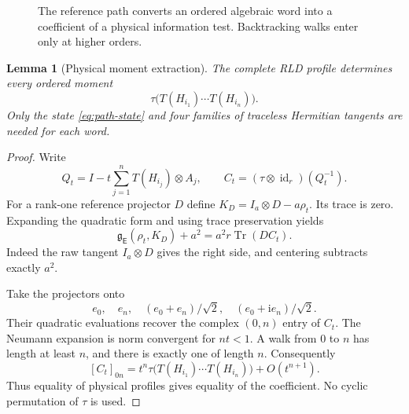 \documentclass[11pt,reqno]{amsart}
\newtheorem{lemma}[theorem]{Lemma}
\theoremstyle{definition}
\theoremstyle{remark}
\numberwithin{equation}{section}
\DeclareMathOperator{\Tr}{Tr}
\DeclareMathOperator{\id}{id}
\newcommand{\E}{\mathsf E}
\newcommand{\ii}{\mathrm i}
\newcommand{\rld}{\mathfrak g}
\begin{document}
\begin{figure}[htbp]
\centering
{}
\caption{The reference path converts an ordered algebraic word into a coefficient of a physical information test. Backtracking walks enter only at higher orders.}
\label{fig:path}
\end{figure}

\begin{lemma}[Physical moment extraction]\label{lem:path}
The complete RLD profile determines every ordered moment
\[
 \tau\bigl(T(H_{i_1})\cdots T(H_{i_n})\bigr).
\]
Only the state \eqref{eq:path-state} and four families of traceless Hermitian tangents are needed for each word.
\end{lemma}

\begin{proof}
Write
\[
 Q_t=I-t\sum_{j=1}^nT(H_{i_j})\otimes A_j,
 \qquad C_t=(\tau\otimes\id_r)(Q_t^{-1}).
\]
For a rank-one reference projector $D$ define $K_D=I_a\otimes D-a\rho_t$. Its trace is zero. Expanding the quadratic form and using trace preservation yields
\begin{equation}\label{eq:path-readout}
 \rld_\E(\rho_t,K_D)+a^2
 =a^2r\Tr(D C_t).
\end{equation}
Indeed the raw tangent $I_a\otimes D$ gives the right side, and centering subtracts exactly $a^2$.

Take the projectors onto
\begin{equation}\label{eq:four-projectors}
 e_0,\quad e_n,\quad (e_0+e_n)/\sqrt2,\quad (e_0+\ii e_n)/\sqrt2.
\end{equation}
Their quadratic evaluations recover the complex $(0,n)$ entry of $C_t$. The Neumann expansion is norm convergent for $nt<1$. A walk from $0$ to $n$ has length at least $n$, and there is exactly one of length $n$. Consequently
\begin{equation}\label{eq:path-coefficient}
 [C_t]_{0n}
 =t^n\tau\bigl(T(H_{i_1})\cdots T(H_{i_n})\bigr)+O(t^{n+1}).
\end{equation}
Thus equality of physical profiles gives equality of the coefficient. No cyclic permutation of $\tau$ is used.
\end{proof}
\end{document}
